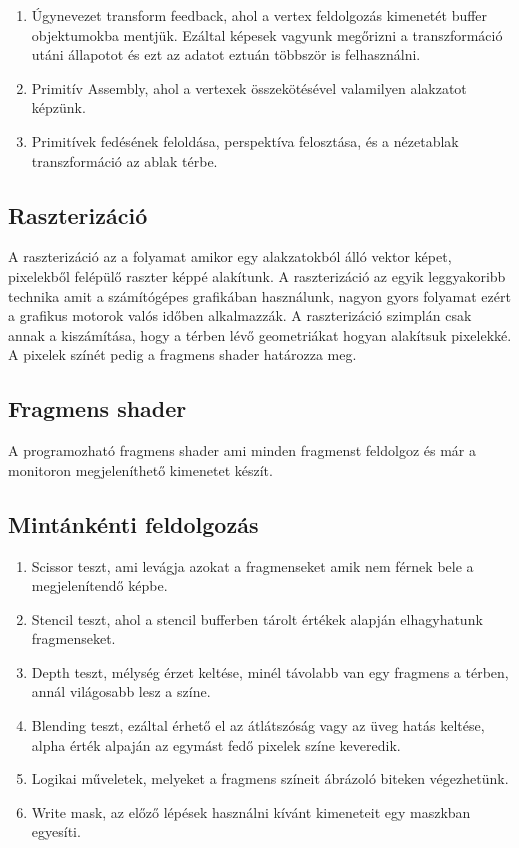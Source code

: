 \begin{enumerate}
    \item Úgynevezet transform feedback, ahol a vertex feldolgozás kimenetét buffer objektumokba mentjük. Ezáltal képesek vagyunk megőrizni a transzformáció utáni állapotot és ezt az adatot eztuán többször is felhasználni.
    \item Primitív Assembly, ahol a vertexek összekötésével valamilyen alakzatot képzünk.
    \item Primitívek fedésének feloldása, perspektíva felosztása, és a nézetablak transzformáció az ablak térbe.
\end{enumerate}

\subsection*{Raszterizáció}
A raszterizáció az a folyamat amikor egy alakzatokból álló vektor képet, pixelekből felépülő raszter képpé alakítunk. A raszterizáció az egyik leggyakoribb technika amit a számítógépes grafikában használunk, nagyon gyors folyamat ezért a grafikus motorok valós időben alkalmazzák. A raszterizáció szimplán csak annak a kiszámítása, hogy a térben lévő geometriákat hogyan alakítsuk pixelekké. A pixelek színét pedig a fragmens shader határozza meg.

\subsection*{Fragmens shader}
A programozható fragmens shader ami minden fragmenst feldolgoz és már a monitoron megjeleníthető kimenetet készít.

\subsection*{Mintánkénti feldolgozás}
\begin{enumerate}
    \item Scissor teszt, ami levágja azokat a fragmenseket amik nem férnek bele a megjelenítendő képbe.
    \item Stencil teszt, ahol a stencil bufferben tárolt értékek alapján elhagyhatunk fragmenseket.
    \item Depth teszt, mélység érzet keltése, minél távolabb van egy fragmens a térben, annál világosabb lesz a színe.
    \item Blending teszt, ezáltal érhető el az átlátszóság vagy az üveg hatás keltése, alpha érték alpaján az egymást fedő pixelek színe keveredik.
    \item Logikai műveletek, melyeket a fragmens színeit ábrázoló biteken végezhetünk.
    \item Write mask, az előző lépések használni kívánt kimeneteit egy maszkban egyesíti.
\end{enumerate}

